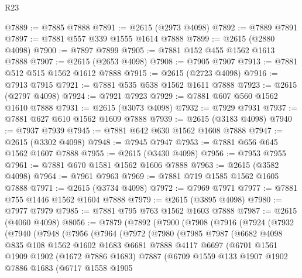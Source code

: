 \begin{lexlean}{R23}
\begin{coremodule}
@7889 := @7885 @7888
@7891 := @2615 (@2973 @4098)
@7892 := @7889 @7891
@7897 := @7881 @557 @339 @1555 @1614 @7888
@7899 := @2615 (@2880 @4098)
@7900 := @7897 @7899
@7905 := @7881 @152 @455 @1562 @1613 @7888
@7907 := @2615 (@2653 @4098)
@7908 := @7905 @7907
@7913 := @7881 @512 @515 @1562 @1612 @7888
@7915 := @2615 (@2723 @4098)
@7916 := @7913 @7915
@7921 := @7881 @535 @538 @1562 @1611 @7888
@7923 := @2615 (@2797 @4098)
@7924 := @7921 @7923
@7929 := @7881 @607 @560 @1562 @1610 @7888
@7931 := @2615 (@3073 @4098)
@7932 := @7929 @7931
@7937 := @7881 @627 @610 @1562 @1609 @7888
@7939 := @2615 (@3183 @4098)
@7940 := @7937 @7939
@7945 := @7881 @642 @630 @1562 @1608 @7888
@7947 := @2615 (@3302 @4098)
@7948 := @7945 @7947
@7953 := @7881 @656 @645 @1562 @1607 @7888
@7955 := @2615 (@3430 @4098)
@7956 := @7953 @7955
@7961 := @7881 @670 @1581 @1562 @1606 @7888
@7963 := @2615 (@3582 @4098)
@7964 := @7961 @7963
@7969 := @7881 @719 @1585 @1562 @1605 @7888
@7971 := @2615 (@3734 @4098)
@7972 := @7969 @7971
@7977 := @7881 @755 @1446 @1562 @1604 @7888
@7979 := @2615 (@3895 @4098)
@7980 := @7977 @7979
@7985 := @7881 @795 @763 @1562 @1603 @7888
@7987 := @2615 (@4060 @4098)
@8056 := @7879
    (@7892
      (@7900
        (@7908
          (@7916
            (@7924
              (@7932
                (@7940
                  (@7948
                    (@7956
                      (@7964
                        (@7972
                          (@7980
                            (@7985
                              @7987
                              (@6682
                                @4098
                                @835
                                @108
                                @1562
                                @1602
                                @1683
                                @6681
                                @7888
                                @4117
                                @6697
                                (@6701
                                  @1561
                                  @1909
                                  @1902
                                  (@1672 @7886 @1683)
                                  @7887
                                  (@6709
                                    @1559
                                    @133
                                    @1907
                                    @1902
                                    @7886
                                    @1683
                                    (@6717
                                      @1558
                                      @1905

\end{coremodule}
\end{lexlean}
